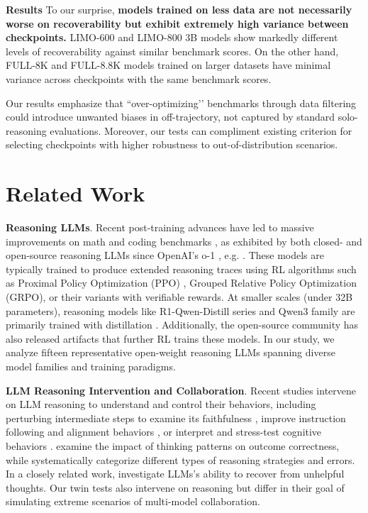 \documentclass{article} %
\begin{document}
\textbf{Results} 
To our surprise, \textbf{models trained on less data are not necessarily worse on recoverability but exhibit extremely high variance between checkpoints.} LIMO-600 and LIMO-800 3B models show markedly different levels of recoverability against similar benchmark scores. On the other hand, FULL-8K and FULL-8.8K models trained on larger datasets have minimal variance across checkpoints with the same benchmark scores. 

Our results emphasize that ``over-optimizing’’ benchmarks through data filtering could introduce unwanted biases in off-trajectory, not captured by standard solo-reasoning evaluations. Moreover, our tests can compliment existing criterion for selecting checkpoints with higher robustness to out-of-distribution scenarios.

\section{Related Work}
\label{sec:background}
\textbf{Reasoning LLMs}. Recent post-training advances have led to massive improvements on math and coding benchmarks \citep{huang2025gemini, guo2025deepseek}, as exhibited by both closed- and open-source reasoning LLMs since OpenAI's o-1 \citep{jaech2024openai}, e.g. \cite{guo2025deepseek,yang2025qwen3,guha2025openthoughts, ye2025limoreasoning,ji2025thinking}. These models are typically trained to produce extended reasoning traces using RL algorithms such as Proximal Policy Optimization (PPO) \citep{schulman2017proximal}, Grouped Relative Policy Optimization (GRPO), or their variants \citep{shao2024deepseekmath} with verifiable rewards.
At smaller scales (under 32B parameters), reasoning models like R1-Qwen-Distill series \citep{guo2025deepseek} and Qwen3 family \citep{yang2025qwen3} are primarily trained with distillation \citep{hinton2015distilling}. Additionally, the open-source community has also released artifacts that further RL trains these models. In our study, we analyze fifteen representative open-weight reasoning LLMs spanning diverse model families and training paradigms.

\textbf{LLM Reasoning Intervention and Collaboration}. Recent studies intervene on LLM reasoning to understand and control their behaviors, including perturbing intermediate steps to examine its faithfulness \citep{arcuschin2025chain, baker2025monitoring}, improve instruction following and alignment behaviors \citep{wu2025effectively}, or interpret \citep{lee2025cot, marjanovic2025deepseek} and stress-test cognitive behaviors \citep{gandhi2025cognitive}. \cite{wen2025thinkpatterns} examine the impact of thinking patterns on outcome correctness, while \cite{he2025can, lee2025cot} systematically categorize different types of reasoning strategies and errors. In a closely related work, \cite{he2025can} investigate LLMs's ability to recover from unhelpful thoughts. Our twin tests also intervene on reasoning but differ in their goal of simulating extreme scenarios of multi-model collaboration.
\end{document}
